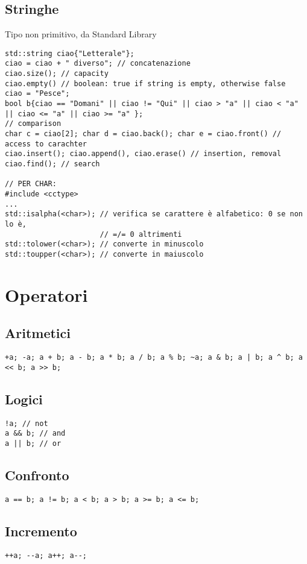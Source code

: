\documentclass[10pt, oneside]{Book}
\begin{document}
\subsection{Stringhe}
Tipo non primitivo, da Standard Library
\begin{verbatim}
std::string ciao{"Letterale"};
ciao = ciao + " diverso"; // concatenazione
ciao.size(); // capacity
ciao.empty() // boolean: true if string is empty, otherwise false
ciao = "Pesce";
bool b{ciao == "Domani" || ciao != "Qui" || ciao > "a" || ciao < "a" || ciao <= "a" || ciao >= "a" }; 
// comparison
char c = ciao[2]; char d = ciao.back(); char e = ciao.front() // access to carachter
ciao.insert(); ciao.append(), ciao.erase() // insertion, removal
ciao.find(); // search

// PER CHAR:
#include <cctype>
...
std::isalpha(<char>); // verifica se carattere è alfabetico: 0 se non lo è,
                      // =/= 0 altrimenti
std::tolower(<char>); // converte in minuscolo
std::toupper(<char>); // converte in maiuscolo
\end{verbatim}

\section{Operatori}
\subsection{Aritmetici}
\begin{verbatim}
+a; -a; a + b; a - b; a * b; a / b; a % b; ~a; a & b; a | b; a ^ b; a << b; a >> b;
\end{verbatim}
\subsection{Logici}
\begin{verbatim}
!a; // not 
a && b; // and
a || b; // or
\end{verbatim}
\subsection{Confronto}
\begin{verbatim}
a == b; a != b; a < b; a > b; a >= b; a <= b;
\end{verbatim}
\subsection{Incremento}
\begin{verbatim}
++a; --a; a++; a--;
\end{verbatim}
\end{document}
